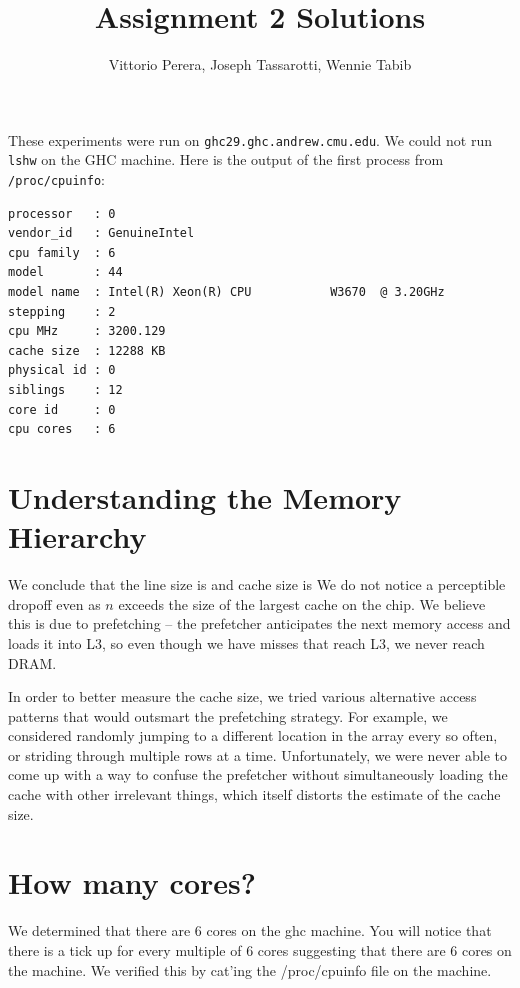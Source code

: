 \documentclass[10pt]{article}
\begin{document}
\title{Assignment 2 Solutions}
\author{Vittorio Perera, Joseph Tassarotti, Wennie Tabib}
\maketitle

These experiments were run on {\tt ghc29.ghc.andrew.cmu.edu}. We could not run {\tt lshw} on the GHC machine. Here is the output of the first
process from {\tt /proc/cpuinfo}:
\begin{verbatim}
processor   : 0
vendor_id   : GenuineIntel
cpu family  : 6
model       : 44
model name  : Intel(R) Xeon(R) CPU           W3670  @ 3.20GHz
stepping    : 2
cpu MHz     : 3200.129
cache size  : 12288 KB
physical id : 0
siblings    : 12
core id     : 0
cpu cores   : 6
\end{verbatim}



\section*{Understanding the Memory Hierarchy}

\begin{center}
\end{center}

We conclude that the line size is and cache size is 
We do not notice a perceptible dropoff even as $n$ exceeds the size of the
largest cache on the chip. We believe this is due to prefetching -- the
prefetcher anticipates the next memory access and loads it into L3, so even
though we have misses that reach L3, we never reach DRAM.

In order to better measure the cache size, we tried various alternative access
patterns that would outsmart the prefetching strategy. For example, we
considered randomly jumping to a different location in the array every so often, or
striding through multiple rows at a time. Unfortunately, we were never able to
come up with a way to confuse the prefetcher without simultaneously loading the
cache with other irrelevant things, which itself distorts the estimate of the
cache size.

\section*{How many cores?}
We determined that there are 6 cores on the ghc machine.
You will notice that there is a tick up for every multiple of 6 cores
suggesting that there are 6 cores on the machine.
We verified this by cat'ing the /proc/cpuinfo file on the machine.
\end{document}
